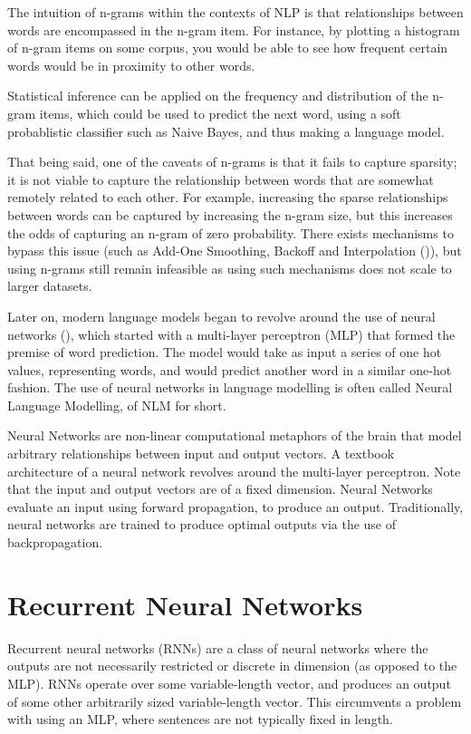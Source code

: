 \documentclass[12pt,twoside]{report}
\begin{document}
The intuition of n-grams within the contexts of NLP is that relationships between words are encompassed in the n-gram item. For instance, by plotting a histogram of n-gram items on some corpus, you would be able to see how frequent certain words would be in proximity to other words.

Statistical inference can be applied on the frequency and distribution of the n-gram items, which could be used to predict the next word, using a soft probablistic classifier such as Naive Bayes, and thus making a language model. 

That being said, one of the caveats of n-grams is that it fails to capture sparsity; it is not viable to capture the relationship between words that are somewhat remotely related to each other. For example, increasing the sparse relationships between words can be captured by increasing the n-gram size, but this increases the odds of capturing an n-gram of zero probability. There exists mechanisms to bypass this issue (such as Add-One Smoothing, Backoff and Interpolation (\cite{jurafsky_speech_2019})), but using n-grams still remain infeasible as using such mechanisms does not scale to larger datasets.

Later on, modern language models began to revolve around the use of neural networks (\cite{bengio_neural_2001}), which started with a multi-layer perceptron (MLP) that formed the premise of word prediction. The model would take as input a series of one hot values, representing words, and would predict another word in a similar one-hot fashion. The use of neural networks in language modelling is often called Neural Language Modelling, of NLM for short.

Neural Networks are non-linear computational metaphors of the brain that model arbitrary relationships between input and output vectors. A textbook architecture of a neural network revolves around the multi-layer perceptron. Note that the input and output vectors are of a fixed dimension. Neural Networks evaluate an input using forward propagation, to produce an output. Traditionally, neural networks are trained to produce optimal outputs via the use of backpropagation. 

\section{Recurrent Neural Networks}
\label{rnn}

Recurrent neural networks (RNNs) are a class of neural networks where the outputs are not necessarily restricted or discrete in dimension (as opposed to the MLP). RNNs operate over some variable-length vector, and produces an output of some other arbitrarily sized variable-length vector. This circumvents a problem with using an MLP, where sentences are not typically fixed in length. 
\end{document}
